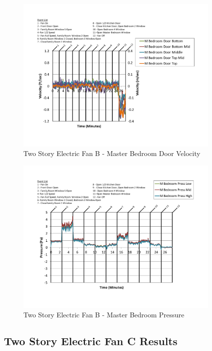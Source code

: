 \documentclass{article}
\begin{document}
\begin{appendices}
	\begin{figure}[H]
		\centering
		\includegraphics[height=3.05in,trim=0.67in 1.1in 0.67in 0.8in,clip=true]{0_Images/Results_Charts/ColdFlow/Two_Story/Electric/B/Master_Bedroom_Door_Velocity.pdf}
		\caption{Two Story Electric Fan B - Master Bedroom Door Velocity}
	\end{figure}
 

	\begin{figure}[H]
		\centering
		\includegraphics[height=3.05in,trim=0.67in 1.1in 0.67in 0.8in,clip=true]{0_Images/Results_Charts/ColdFlow/Two_Story/Electric/B/Master_Bedroom_Pressure.pdf}
		\caption{Two Story Electric Fan B - Master Bedroom Pressure}
	\end{figure}
 
	\clearpage

		\clearpage
\clearpage		\large
\subsection{Two Story Electric Fan C Results} \label{App:Two_StoryElectricFanCResults} 


\end{appendices}
\end{document}
